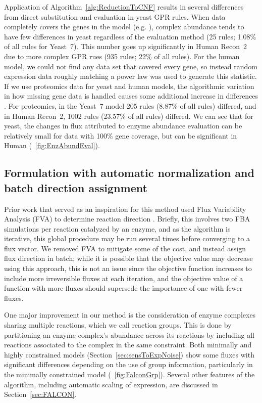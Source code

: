 Application of \suppOrApp Algorithm~\ref{alg:ReductionToCNF} results in several
differences from direct substitution and evaluation in yeast GPR
rules. When data completely covers the genes in the model
(e.g. \citealt{Lee2012}), complex abundance tends to have few differences in yeast
regardless of the evaluation method (25 rules; 1.08\% of all rules for
Yeast~7). This number goes up significantly in Human Recon~2
\citep{Thiele2013} due to more complex GPR rues (935 rules; 22\% of
all rules). For the human model, we could not find any data set that
covered every gene, so instead random expression data roughly matching
a power law was used to generate this statistic. If we use proteomics
data for yeast and human models, the algorithmic variation in how missing gene
data is handled causes some additional increase in differences
\citep{Picotti2013,Gholami2013}.  For proteomics, in the Yeast~7 model
205 rules (8.87\% of all rules) differed, and in Human Recon~2, 1002
rules (23.57\% of all rules) differed. We can see that for yeast, the
changes in flux attributed to enzyme abundance evaluation can be
relatively small for data with 100\% gene coverage, but can be 
significant in Human (\suppOrApp \Fig~\ref{fig:EnzAbundEval}).

%
%


\subsection{Formulation with automatic normalization and batch direction assignment}

Prior work that served as an inspiration for this method used Flux
Variability Analysis (FVA) to determine reaction direction
\citep{Lee2012}. Briefly, this involves two FBA simulations per
reaction catalyzed by an enzyme, and as the algorithm is iterative,
this global procedure may be run several times before converging to a
flux vector. We removed FVA to mitigate some
of the cost, and instead assign flux direction in batch; while it is
possible that the objective value may decrease using this approach,
this is not an issue since the objective function increases to include
more irreversible fluxes at each iteration, and the objective value of
a function with more fluxes should supersede the importance of one
with fewer fluxes.

One major improvement in our method is the consideration of enzyme
complexes sharing multiple reactions, which we call reaction groups.
This is done by partitioning an enzyme complex's abundance across
its reactions by including all reactions associated to the complex
in the same constraint.
Both minimally and highly constrained models
(Section~\ref{sec:sensToExpNoise}) show some fluxes with significant
differences depending on the use of group information, particularly in
the minimally constrained model (\Fig~\ref{fig:FalconGrp}). Several
other features of the algorithm, including automatic scaling of
expression, are discussed in \suppOrApp Section~\ref{sec:FALCON}.

